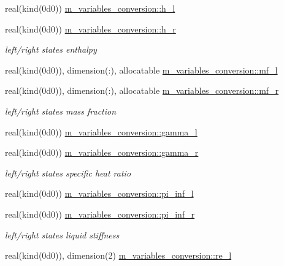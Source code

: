 \begin{Indent}
\begin{DoxyCompactItemize}
real(kind(0d0)) \hyperlink{namespacem__variables__conversion_a7f9d10004d2efcf06092c8e83afd90a9}{m\+\_\+variables\+\_\+conversion\+::h\+\_\+l}
\item 
real(kind(0d0)) \hyperlink{namespacem__variables__conversion_a00d96d7b614a5c0ce7dbe96d556b0342}{m\+\_\+variables\+\_\+conversion\+::h\+\_\+r}
\begin{DoxyCompactList}\small\item\em left/right states enthalpy \end{DoxyCompactList}\item 
real(kind(0d0)), dimension(\+:), allocatable \hyperlink{namespacem__variables__conversion_a0f5485ff839ecbf46ff48d6dc74c0d90}{m\+\_\+variables\+\_\+conversion\+::mf\+\_\+l}
\item 
real(kind(0d0)), dimension(\+:), allocatable \hyperlink{namespacem__variables__conversion_ae846c6fc6552d5bfe98e1e6ad69d1097}{m\+\_\+variables\+\_\+conversion\+::mf\+\_\+r}
\begin{DoxyCompactList}\small\item\em left/right states mass fraction \end{DoxyCompactList}\item 
real(kind(0d0)) \hyperlink{namespacem__variables__conversion_a40a27c491716f10b38a268a8e93c5a5f}{m\+\_\+variables\+\_\+conversion\+::gamma\+\_\+l}
\item 
real(kind(0d0)) \hyperlink{namespacem__variables__conversion_a08058afcc5db00000abcceb8e3968eee}{m\+\_\+variables\+\_\+conversion\+::gamma\+\_\+r}
\begin{DoxyCompactList}\small\item\em left/right states specific heat ratio \end{DoxyCompactList}\item 
real(kind(0d0)) \hyperlink{namespacem__variables__conversion_a6f2d4a77c301f98562a27a23b2983691}{m\+\_\+variables\+\_\+conversion\+::pi\+\_\+inf\+\_\+l}
\item 
real(kind(0d0)) \hyperlink{namespacem__variables__conversion_ab9f7728bd98c31174efdeaf389d724c5}{m\+\_\+variables\+\_\+conversion\+::pi\+\_\+inf\+\_\+r}
\begin{DoxyCompactList}\small\item\em left/right states liquid stiffness \end{DoxyCompactList}\item 
real(kind(0d0)), dimension(2) \hyperlink{namespacem__variables__conversion_a3b45952794b8a8edb8ec8bc3612edbe3}{m\+\_\+variables\+\_\+conversion\+::re\+\_\+l}

\end{DoxyCompactItemize}
\end{Indent}
